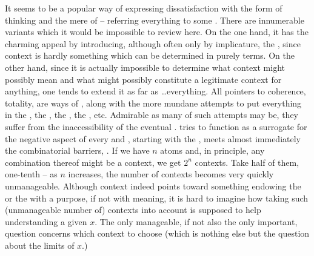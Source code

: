 It seems to be a popular way of expressing dissatisfaction with the
 form of  thinking and the mere
 of   -- referring everything to
some .  There are innumerable variants which it would be impossible
to review here.  On the one hand, it has the charming appeal by introducing,
although often only by implicature, the , since context is hardly
something which can be determined in purely  terms.  On the other
hand, since it is actually impossible to determine what context might possibly
mean and what might possibly constitute a legitimate context for anything, one
tends to extend it as far as \ldots everything.  All pointers to coherence,
totality,  are ways of , along with the
more mundane attempts to put everything in the , the
, the , the ,
etc.  Admirable as many of such attempts may be, they suffer from the
inaccessibility of the eventual .  tries to function as a
surrogate for the negative aspect of every  and
, starting with the 
, meets almost immediately the combinatorial barriers,
.  If we have $n$ atoms and, in principle, any
combination thereof might be a context, we get $2^{n}$ contexts.  Take half of
them, one-tenth -- as $n$ increases, the number of contexts becomes very quickly
unmanageable.  Although context indeed points toward something endowing the
 or the  with a purpose, if not with meaning, it is hard
to imagine how taking such (unmanageable number of) contexts into account is
supposed to help understanding a given  $x$. The only manageable, if
not also the only important, question concerns which context to choose (which is
nothing else but the question about the limits of $x$.)

